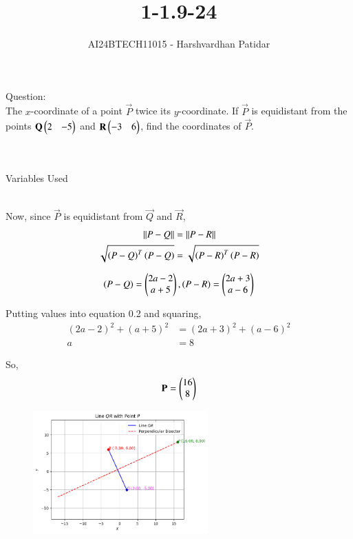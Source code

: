\documentclass[journal]{IEEEtran}
\begin{document}

\vspace{3cm}

\title{1-1.9-24}
\author{AI24BTECH11015 - Harshvardhan Patidar}
 \maketitle
{\let\newpage\relax\maketitle}

\renewcommand{\thefigure}{\theenumi}
\renewcommand{\thetable}{\theenumi}
\setlength{\intextsep}{10pt} %


\renewcommand{\thetable}{\theenumi}


	Question:\\
		The $x$-coordinate of a point $\vec{P}$ twice its $y$-coordinate. If $\vec{P}$ is equidistant from the points $\mathbf{Q} \begin{pmatrix}2&-5\end{pmatrix}$ and $\mathbf{R} \begin{pmatrix}-3&6\end{pmatrix}$, find the coordinates of $\vec{P}$.\\ \\


	\solution\\
		\begin{table}[h!]    
  			\centering
  			
  			\caption{Variables Used}
  			\label{tab1-1.9-24}
		\end{table}\\

		
		Now, since $\vec{P}$ is equidistant from $\vec{Q}$ and $\vec{R}$,
			\begin{align}
				\left\lVert P - Q\right\rVert  &=  \left\lVert P - R \right\rVert\\
				\sqrt{\left(P-Q\right)^T\left(P-Q\right)}&=\sqrt{\left(P-R\right)^T\left(P-R\right)}
			\end{align}

			$$ \left(P-Q\right) = \begin{pmatrix}2a-2\\a+5\end{pmatrix}, \left(P-R\right) = \begin{pmatrix}2a+3\\a-6\end{pmatrix}$$

			Putting values into equation 0.2 and squaring,
			\begin{align}	
				(2a-2)^2 + (a+5)^2 &= (2a+3)^2 + (a-6)^2\\
				a &= 8
			\end{align}

			So, $$\mathbf{P} = \begin{pmatrix}16\\8\end{pmatrix}$$

			               
	\begin{figure}[H]
		\centering
		\includegraphics[width=0.6\textwidth]{plots/plot.png}
	\end{figure}
		
  
\end{document}
